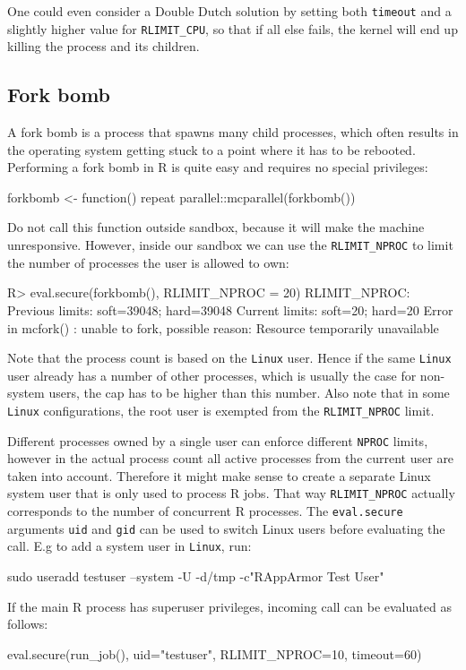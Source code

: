 \documentclass{jss}
\newcommand{\R}{\textsf{R}\xspace}
\newcommand{\Linux}{\texttt{Linux}\xspace}
\begin{document}
\begin{appendices}
One could even consider a Double Dutch solution by setting both \texttt{timeout}
and a slightly higher value for \texttt{RLIMIT\_CPU}, so that if all else fails,
the kernel will end up killing the process and its children.

\subsection{Fork bomb}

A fork bomb is a process that spawns many child processes, which often results
in the operating system getting stuck to a point where it has to be rebooted.
Performing a fork bomb in \R is quite easy and requires no special privileges:
\begin{CodeChunk}
\begin{CodeInput}
forkbomb <- function(){
  repeat{
    parallel::mcparallel(forkbomb())
  }
}
\end{CodeInput}
\end{CodeChunk}
Do not call this function outside sandbox, because it will make the machine
unresponsive. However, inside our sandbox we can use the \texttt{RLIMIT\_NPROC}
to limit the number of processes the user is allowed to own:
\begin{CodeChunk}
\begin{CodeInput}
R> eval.secure(forkbomb(), RLIMIT_NPROC = 20)
RLIMIT_NPROC:
Previous limits: soft=39048; hard=39048
Current limits: soft=20; hard=20
Error in mcfork() :
  unable to fork, possible reason: Resource temporarily unavailable
\end{CodeInput}
\end{CodeChunk}
Note that the process count is based on the \Linux user. Hence if the same
\Linux user already has a number of other processes, which is usually the case
for non-system users, the cap has to be higher than this number. Also note that
in some \Linux configurations, the root user is exempted from the
\texttt{RLIMIT\_NPROC} limit.

Different processes owned by a single user can enforce different \texttt{NPROC}
limits, however in the actual process count all active processes from the
current user are taken into account. Therefore it might make sense to create a
separate Linux system user that is only used to process \R jobs. That way
\texttt{RLIMIT\_NPROC} actually corresponds to the number of concurrent \R
processes. The \texttt{eval.secure} arguments \texttt{uid} and \texttt{gid}
can be used to switch Linux users before evaluating the call. E.g to add a
system user in \Linux, run:
\begin{CodeChunk}
\begin{CodeInput}
sudo useradd testuser --system -U -d/tmp -c"RAppArmor Test User"
\end{CodeInput}
\end{CodeChunk}
If the main \R process has superuser privileges, incoming call can be
evaluated as follows:
\begin{CodeChunk}
\begin{CodeInput}
eval.secure(run_job(), uid="testuser", RLIMIT_NPROC=10, timeout=60)
\end{CodeInput}
\end{CodeChunk}


\end{appendices}
\end{document}
